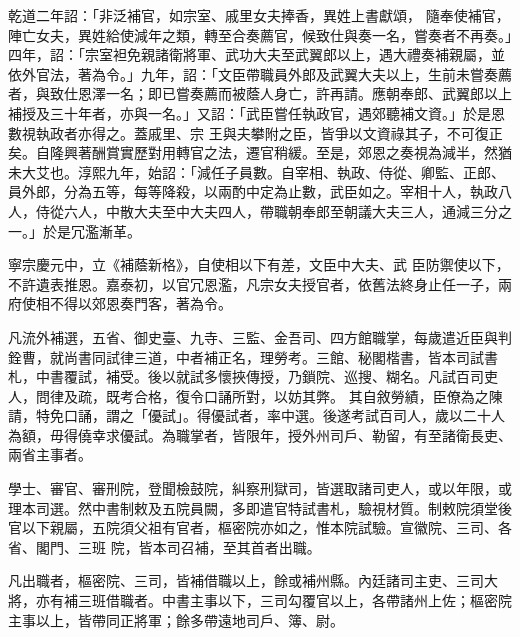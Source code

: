\begin{pinyinscope}
 乾道二年詔：「非泛補官，如宗室、戚里女夫捧香，異姓上書獻頌，
 隨奉使補官，陣亡女夫，異姓給使減年之類，轉至合奏薦官，候致仕與奏一名，嘗奏者不再奏。」四年，詔：「宗室袒免親諸衛將軍、武功大夫至武翼郎以上，遇大禮奏補親屬，並依外官法，著為令。」九年，詔：「文臣帶職員外郎及武翼大夫以上，生前未嘗奏薦者，與致仕恩澤一名；即已嘗奏薦而被蔭人身亡，許再請。應朝奉郎、武翼郎以上補授及三十年者，亦與一名。」又詔：「武臣嘗任執政官，遇郊聽補文資。」於是恩數視執政者亦得之。蓋戚里、宗
 王與夫攀附之臣，皆爭以文資祿其子，不可復正矣。自隆興著酬賞實歷對用轉官之法，遷官稍緩。至是，郊恩之奏視為減半，然猶未大艾也。淳熙九年，始詔：「減任子員數。自宰相、執政、侍從、卿監、正郎、員外郎，分為五等，每等降殺，以兩酌中定為止數，武臣如之。宰相十人，執政八人，侍從六人，中散大夫至中大夫四人，帶職朝奉郎至朝議大夫三人，通減三分之一。」於是冗濫漸革。



 寧宗慶元中，立《補蔭新格》，自使相以下有差，文臣中大夫、武
 臣防禦使以下，不許遺表推恩。嘉泰初，以官冗恩濫，凡宗女夫授官者，依舊法終身止任一子，兩府使相不得以郊恩奏門客，著為令。



 凡流外補選，五省、御史臺、九寺、三監、金吾司、四方館職掌，每歲遣近臣與判銓曹，就尚書同試律三道，中者補正名，理勞考。三館、秘閣楷書，皆本司試書札，中書覆試，補受。後以就試多懷挾傳授，乃鎖院、巡搜、糊名。凡試百司吏人，問律及疏，既考合格，復令口誦所對，以妨其弊。
 其自敘勞績，臣僚為之陳請，特免口誦，謂之「優試」。得優試者，率中選。後遂考試百司人，歲以二十人為額，毋得僥幸求優試。為職掌者，皆限年，授外州司戶、勒留，有至諸衛長吏、兩省主事者。



 學士、審官、審刑院，登聞檢鼓院，糾察刑獄司，皆選取諸司吏人，或以年限，或理本司選。然中書制敕及五院員闕，多即遣官特試書札，驗視材質。制敕院須堂後官以下親屬，五院須父祖有官者，樞密院亦如之，惟本院試驗。宣徽院、三司、各省、閣門、三班
 院，皆本司召補，至其首者出職。



 凡出職者，樞密院、三司，皆補借職以上，餘或補州縣。內廷諸司主吏、三司大將，亦有補三班借職者。中書主事以下，三司勾覆官以上，各帶諸州上佐；樞密院主事以上，皆帶同正將軍；餘多帶遠地司戶、簿、尉。




\end{pinyinscope}
